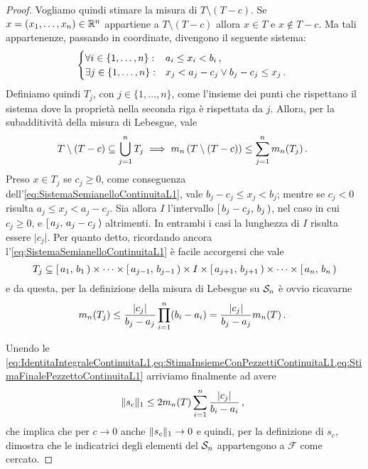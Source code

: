 \begin{proof}
	Vogliamo quindi stimare la misura di $T\setminus\left(T-c\right)$. 
	Se $x=(x_1,\dots,x_n)\in\R^n$ appartiene a $T\setminus\left(T-c\right)$ allora $x\in T$ e $x\not\in T-c$. Ma tali appartenenze, passando in coordinate, divengono il seguente sistema:
	\begin{equation}\label{eq:SistemaSemianelloContinuitaL1}
		\begin{cases}
			\forall i\in\{1,\dots,n\}: &a_i\le x_i<b_i \virgola\\
			\exists j\in\{1,\dots,n\}: &x_j<a_j-c_j \vee b_j-c_j\le x_j \punto
		\end{cases}
	\end{equation}
	Definiamo quindi $T_j$, con $j\in\{1,\dots,n\}$, come l'insieme dei punti che rispettano il sistema dove la proprietà nella seconda riga è rispettata da $j$.
	Allora, per la subadditività della misura di Lebesgue, vale
	\begin{equation}\label{eq:StimaInsiemeConPezzettiContinuitaL1}
		T\setminus\left(T-c\right)\subseteq \bigcup_{j=1}^n T_j \implies m_n\left(T\setminus\left(T-c\right)\right)\le \sum_{j=1}^n m_n(T_j) \punto
	\end{equation}
	Preso $x\in T_j$ se $c_j\ge 0$, come conseguenza dell'\cref{eq:SistemaSemianelloContinuitaL1}, vale $b_j-c_j\le x_j<b_j$; mentre se $c_j<0$ risulta $a_j\le x_j<a_j-c_j$. Sia allora $I$ l'intervallo $\co{b_j-c_j}{b_j}$, nel caso in cui $c_j\ge 0$, e $\co{a_j}{a_j-c_j}$ altrimenti. In entrambi i casi la lunghezza di $I$ risulta essere $\lvert c_j \rvert$.
	Per quanto detto, ricordando ancora l'\cref{eq:SistemaSemianelloContinuitaL1} è facile accorgersi che vale
	\begin{equation*}
		T_j\subseteq \co{a_1}{b_1}\times\cdots\times\co{a_{j-1}}{b_{j-1}}\times I\times\co{a_{j+1}}{b_{j+1}}\times\cdots\times \co{a_n}{b_n}
	\end{equation*}
	e da questa, per la definizione della misura di Lebesgue su $\S_n$ è ovvio ricavarne
	\begin{equation}\label{eq:StimaFinalePezzettoContinuitaL1}
		m_n(T_j)\le \frac{\lvert c_j\rvert }{b_j-a_j} \prod_{i=1}^n (b_i-a_i)=\frac{\lvert c_j\rvert }{b_j-a_j} m_n(T) \punto
	\end{equation}
	
	Unendo le \cref{eq:IdentitaIntegraleContinuitaL1,eq:StimaInsiemeConPezzettiContinuitaL1,eq:StimaFinalePezzettoContinuitaL1} arriviamo finalmente ad avere
	\begin{equation*}
		\LNorm{s_c}\le 2m_n(T)\sum_{i=1}^n \frac{\lvert c_j\rvert }{b_i-a_i}\virgola
	\end{equation*}
	che implica che per $c\to 0$ anche $\LNorm{s_c}\to 0$ e quindi, per la definizione di $s_c$, dimostra che le indicatrici degli elementi del \semiring{} $\S_n$ appartengono a $\mathcal F$ come cercato.
\end{proof}



